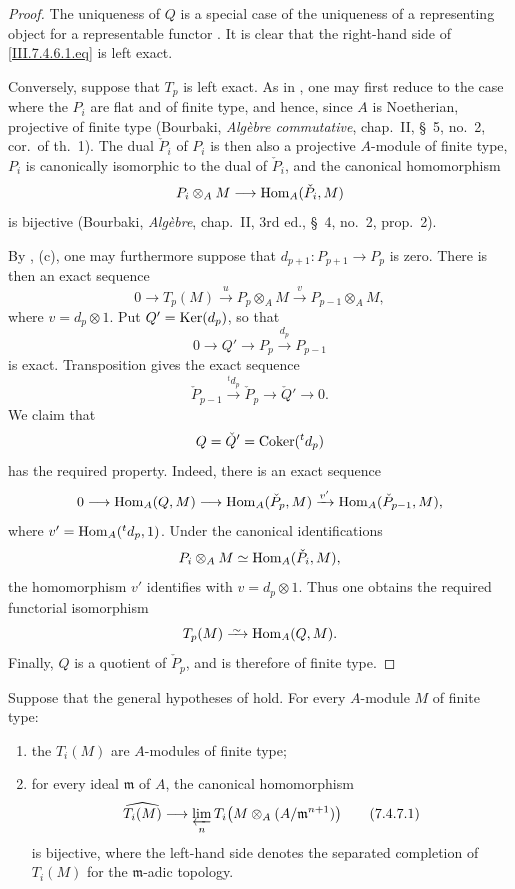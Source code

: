 \begin{proof}
The uniqueness of $Q$ is a special case of the uniqueness of a
representing object for a representable functor
.  It is clear that the right-hand side of
\eqref{III.7.4.6.1.eq} is left exact.

Conversely, suppose that $T_p$ is left exact.  As in
, one may first reduce to the case where the
$P_i$ are flat and of finite type, and hence, since $A$ is
Noetherian, projective of finite type (Bourbaki,
\emph{Alg\`ebre commutative}, chap.~II, \S~5, no.~2, cor.\ of
th.~1).  The dual $\check{P}_i$ of $P_i$ is then also a
projective $A$-module of finite type, $P_i$ is canonically
isomorphic to the dual of $\check{P}_i$, and the canonical
homomorphism
\[
  P_i\otimes_A M
  \longrightarrow
  \operatorname{Hom}_A(\check{P}_i,M)
\]
is bijective (Bourbaki, \emph{Alg\`ebre}, chap.~II,
3rd ed., \S~4, no.~2, prop.~2).

By , (c), one may furthermore suppose that
$d_{p+1}:P_{p+1}\to P_p$ is zero.  There is then an exact
sequence
\[
  0
  \longrightarrow T_p(M)
  \xrightarrow{u}
  P_p\otimes_A M
  \xrightarrow{v}
  P_{p-1}\otimes_A M,
\]
where $v=d_p\otimes 1$.  Put $Q'=\operatorname{Ker}(d_p)$, so that
\[
  0
  \longrightarrow Q'
  \longrightarrow P_p
  \xrightarrow{d_p}
  P_{p-1}
\]
is exact.  Transposition gives the exact sequence
\[
  \check{P}_{p-1}
  \xrightarrow{{}^t d_p}
  \check{P}_p
  \longrightarrow
  \check{Q}'
  \longrightarrow 0.
\]
We claim that
\[
  Q=\check{Q}'=\operatorname{Coker}({}^t d_p)
\]
has the required property.  Indeed, there is an exact sequence
\[
  0
  \longrightarrow \operatorname{Hom}_A(Q,M)
  \longrightarrow \operatorname{Hom}_A(\check{P}_p,M)
  \xrightarrow{v'}
  \operatorname{Hom}_A(\check{P}_{p-1},M),
\]
where $v'=\operatorname{Hom}_A({}^t d_p,1)$.  Under the canonical
identifications
\[
  P_i\otimes_A M\simeq\operatorname{Hom}_A(\check{P}_i,M),
\]
the homomorphism $v'$ identifies with $v=d_p\otimes 1$.
Thus one obtains the required functorial isomorphism
\[
  T_p(M)\isoto\Hom_A(Q,M).
\]
Finally, $Q$ is a quotient of $\check{P}_p$, and is therefore
of finite type.
\end{proof}

\begin{proposition}[7.4.7]
\label{III.7.4.7}
Suppose that the general hypotheses of  hold.
For every $A$-module $M$ of finite type:
\begin{enumerate}
  \item[(i)] the $T_i(M)$ are $A$-modules of finite type;
  \item[(ii)] for every ideal $\mathfrak m$ of $A$, the
    canonical homomorphism
    \[
      \widehat{T_i(M)}
      \longrightarrow
      \varprojlim_n
      T_i\bigl(M\otimes_A(A/\mathfrak m^{n+1})\bigr)
      \tag{7.4.7.1}\label{III.7.4.7.1.eq}
    \]
    is bijective, where the left-hand side denotes the
    separated completion of $T_i(M)$ for the
    $\mathfrak m$-adic topology.
\end{enumerate}
\end{proposition}

